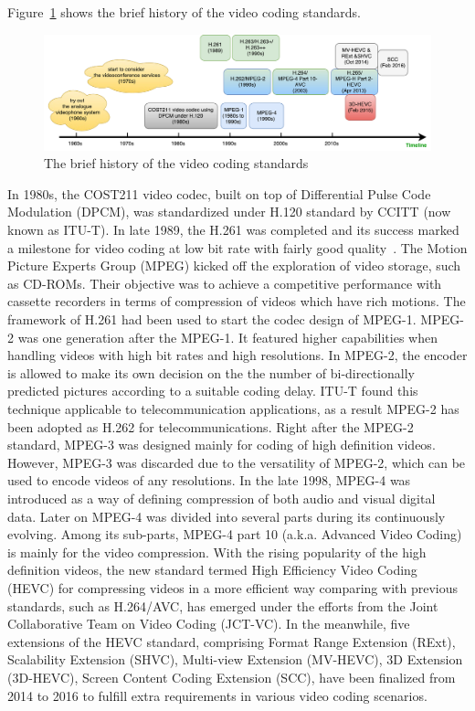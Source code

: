 Figure~\ref{fig:video-std-brief-history} shows the brief history of the
video coding standards.
\begin{figure}
    \centering
    \includegraphics[width=\textwidth,height=\textheight,keepaspectratio]{Figures/video-std-brief-history.pdf}
    \caption[The brief history of the video coding standards]
    {The brief history of the video coding standards}
    \label{fig:video-std-brief-history}
\end{figure}
In 1980s, the COST211 video codec, built on top of Differential
Pulse Code Modulation (DPCM), was standardized under H.120 standard by CCITT
(now known as ITU-T).
In late 1989, the H.261 was completed and its success marked a milestone for
video coding at low bit rate with fairly good quality~\parencite{RN181}.
The Motion Picture Experts Group (MPEG) kicked off the exploration of video
storage, such as CD-ROMs.
Their objective was to achieve a competitive performance with cassette
recorders in terms of compression of videos which have rich motions.
The framework of H.261 had been used to start the codec design of MPEG-1.
MPEG-2 was one generation after the MPEG-1.
It featured higher capabilities when handling videos with
high bit rates and high resolutions.
In MPEG-2, the encoder is allowed to make its own decision on the
the number of bi-directionally predicted pictures according to a
suitable coding delay.
ITU-T found this technique applicable to telecommunication applications, as
a result MPEG-2 has been adopted as H.262 for telecommunications.
Right after the MPEG-2 standard, MPEG-3 was designed mainly for coding of
high definition videos.
However, MPEG-3 was discarded due to the versatility of MPEG-2, which
can be used to encode videos of any resolutions.
In the late 1998, MPEG-4 was introduced as a way of defining compression of
both audio and visual digital data.
Later on MPEG-4 was divided into several parts during its continuously evolving.
Among its sub-parts, MPEG-4 part 10 (a.k.a. Advanced Video Coding) is mainly
for the video compression.
With the rising popularity of the high definition videos, the new standard
termed High Efficiency Video Coding (HEVC) for compressing videos in a more
efficient way comparing with previous standards, such as H.264/AVC, has
emerged under the efforts from the Joint Collaborative Team on Video
Coding (JCT-VC).
In the meanwhile, five extensions of the HEVC standard, comprising
Format Range Extension (RExt), Scalability Extension (SHVC),
Multi-view Extension (MV-HEVC), 3D Extension (3D-HEVC),
Screen Content Coding Extension (SCC),  have been finalized
from 2014 to 2016 to fulfill extra requirements in various video coding
scenarios.

